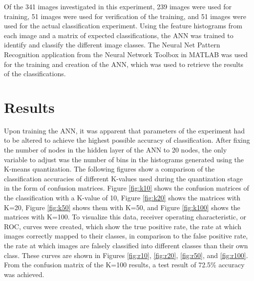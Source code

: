 \documentclass{article}
\begin{document}
Of the 341 images investigated in this experiment, 239 images were used for training, 51 images were used for verification of the training, and 51 images were used for the actual classification experiment. Using the feature histograms from each image and a matrix of expected classifications, the ANN was trained to identify and classify the different image classes. The Neural Net Pattern Recognition application from the Neural Network Toolbox in MATLAB was used for the training and creation of the ANN, which was used to retrieve the results of the classifications.

%
\section{Results}
\label{sec:results}
Upon training the ANN, it was apparent that parameters of the experiment had to be altered to achieve the highest possible accuracy of classification. After fixing the number of nodes in the hidden layer of the ANN to 20 nodes, the only variable to adjust was the number of bins in the histograms generated using the K-means quantization. The following figures show a comparison of the classification accuracies of different K-values used during the quantization stage in the form of confusion matrices. Figure \ref{fig:k10} shows the confusion matrices of the classification with a K-value of 10, Figure \ref{fig:k20} shows the matrices with K=20, Figure \ref{fig:k50} shows them with K=50, and Figure \ref{fig:k100} shows the matrices with K=100. To visualize this data, receiver operating characteristic, or ROC, curves were created, which show the true positive rate, the rate at which images correctly mapped to their classes, in comparison to the false positive rate, the rate at which images are falsely classified into different classes than their own class. These curves are shown in Figures \ref{fig:r10}, \ref{fig:r20}, \ref{fig:r50}, and \ref{fig:r100}. From the confusion matrix of the K=100 results, a test result of 72.5\% accuracy was achieved.
%
\end{document}
